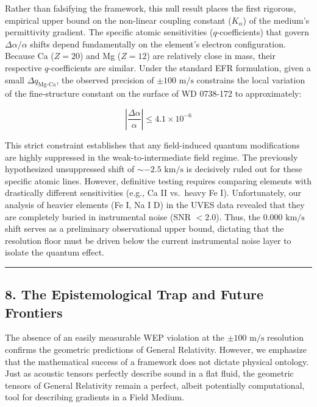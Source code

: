 \documentclass[twocolumn]{article}
\begin{document}
Rather than falsifying the framework, this null result places the first
rigorous, empirical upper bound on the non-linear coupling constant
(\(K_{\alpha}\)) of the medium's permittivity gradient. The specific
atomic sensitivities (\(q\)-coefficients) that govern
\(\Delta \alpha / \alpha\) shifts depend fundamentally on the element's
electron configuration. Because Ca (\(Z=20\)) and Mg (\(Z=12\)) are
relatively close in mass, their respective \(q\)-coefficients are
similar. Under the standard EFR formulation, given a small
\(\Delta q_{\text{Mg-Ca}}\), the observed precision of
\(\pm 100 \text{ m/s}\) constrains the local variation of the
fine-structure constant on the surface of WD 0738-172 to approximately:

\[ \left| \frac{\Delta \alpha}{\alpha} \right| \le 4.1 \times 10^{-6} \]

This strict constraint establishes that any field-induced quantum
modifications are highly suppressed in the weak-to-intermediate field
regime. The previously hypothesized unsuppressed shift of
\(\sim -2.5 \text{ km/s}\) is decisively ruled out for these specific
atomic lines. However, definitive testing requires comparing elements
with drastically different sensitivities (e.g., Ca II vs.~heavy Fe I).
Unfortunately, our analysis of heavier elements (Fe I, Na I D) in the
UVES data revealed that they are completely buried in instrumental noise
(SNR \(< 2.0\)). Thus, the \(0.000 \text{ km/s}\) shift serves as a
preliminary observational upper bound, dictating that the resolution
floor must be driven below the current instrumental noise layer to
isolate the quantum effect.

\begin{center}\rule{0.5\linewidth}{0.5pt}\end{center}

\subsection{8. The Epistemological Trap and Future
Frontiers}\label{the-epistemological-trap-and-future-frontiers}

The absence of an easily measurable WEP violation at the
\(\pm 100 \text{ m/s}\) resolution confirms the geometric predictions of
General Relativity. However, we emphasize that the mathematical success
of a framework does not dictate physical ontology. Just as acoustic
tensors perfectly describe sound in a flat fluid, the geometric tensors
of General Relativity remain a perfect, albeit potentially
computational, tool for describing gradients in a Field Medium.
\end{document}
